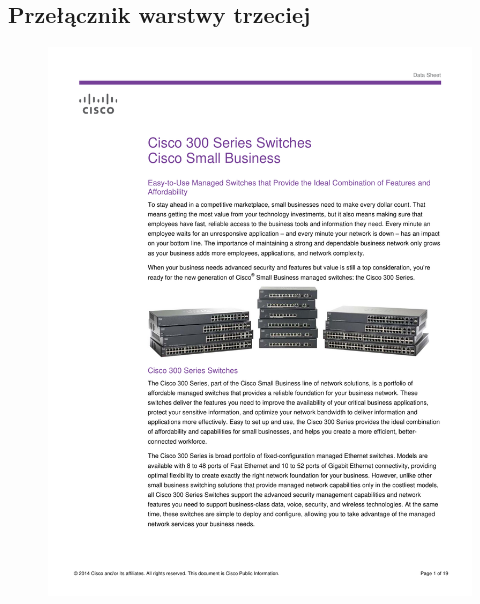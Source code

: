 \documentclass[a4paper, 12pt]{article}
\begin{document}
\subsection{Przełącznik warstwy trzeciej}
\begin{figure}[H]
\centering
    \includegraphics[scale=0.80]{spec/sw3.pdf}%
    \label{fig:PropProf}
\end{figure}
\end{document}
